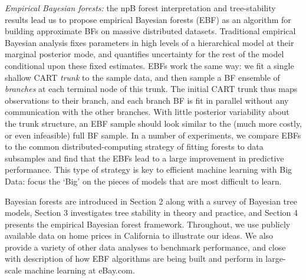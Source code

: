 \documentclass{article}
\begin{document}
\textit{Empirical Bayesian forests:} the npB forest
interpretation and tree-stability results lead us to propose empirical
Bayesian forests (EBF) as an algorithm for building approximate BFs on massive
distributed datasets.%
Traditional empirical Bayesian analysis fixes parameters in high levels of a
hierarchical model at their marginal posterior mode, and quantifies
uncertainty for the rest of the model conditional upon these fixed estimates.
EBFs work the same way: we fit a single shallow CART \textit{trunk} to the
sample data, and then sample a BF ensemble of \textit{branches} at each
terminal node of this trunk.  The initial CART trunk thus maps observations to
their branch, and each branch BF is fit in parallel without any
communication with the other branches.  With little posterior
variability about the trunk structure, an EBF sample should look similar to
the (much more costly, or even infeasible) full BF sample.  In a number of
experiments, we compare EBFs to the common distributed-computing strategy of
fitting forests to data subsamples and find that the EBFs lead to a large
improvement in predictive performance.  This type of strategy is 
key to efficient machine learning with Big Data: focus the `Big' on the pieces
of models that are most difficult to learn.





Bayesian forests are introduced in Section 2 along with a survey
of  Bayesian tree models, Section 3  investigates tree stability in
theory and practice, and Section 4 presents the empirical Bayesian forest
framework. Throughout, we use publicly available data on home prices in
California to illustrate our ideas. We also provide a variety of other data
analyses to benchmark performance, and close with description of how EBF
algorithms are being built and perform in large-scale machine learning at
eBay.com.
\end{document}

